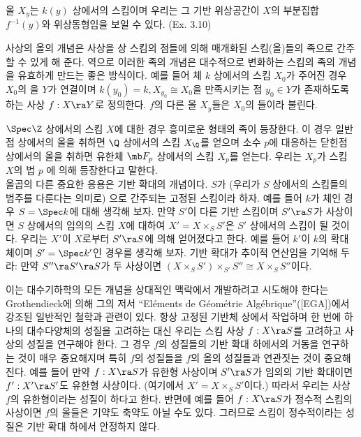 	올 $X_y$는 $k(y)$ 상에서의 스킴이며 우리는 그 기반 위상공간이 $X$의 부분집합 $f^{-1}(y)$와 위상동형임을 보일 수 있다. (Ex. 3.10)
	
	사상의 올의 개념은 사상을 상 스킴의 점들에 의해 매개화된 스킴(올)들의 족으로 간주할 수 있게 해 준다.
	역으로 이러한 족의 개념은 대수적으로 변화하는 스킴의 족의 개념을 유효하게 만드는 좋은 방식이다.
	예를 들어 체 $k$ 상에서의 스킴 $X_0$가 주어진 경우 $X_0$의 을
	$Y$가 연결이며 $k(y_0)=k,X_{y_0}\cong X_0$을 만족시키는 점 $y_0\in Y$가 존재하도록 하는 사상 $f:X\ra Y$로 정의한다.
	$f$의 다른 올 $X_y$들은 $X_0$의 들이라 불린다.
	
	$\Spec\Z$ 상에서의 스킴 $X$에 대한 경우 흥미로운 형태의 족이 등장한다.
	이 경우 일반점 상에서의 올을 취하면 $\Q$ 상에서의 스킴 $X_\Q$를 얻으며
	소수 $p$에 대응하는 닫힌점 상에서의 올을 취하면 유한체 $\mb F_p$ 상에서의 스킴 $X_p$를 얻는다.
	우리는 $X_p$가 스킴 $X$의 법 $p$ 에 의해 등장한다고 말한다.\\
	
	올곱의 다른 중요한 응용은 기반 확대의 개념이다. $S$가 (우리가 $S$ 상에서의 스킴들의 범주를 다룬다는 의미로)
	으로 간주되는 고정된 스킴이라 하자. 예를 들어 $k$가 체인 경우 $S=\Spec k$에 대해 생각해 보자.
	만약 $S'$이 다른 기반 스킴이며 $S'\ra S$가 사상이면
	$S$ 상에서의 임의의 스킴 $X$에 대하여 $X'=X\times_SS'$은 $S'$ 상에서의 스킴이 될 것이다.
	우리는 $X'$이 $X$로부터  $S'\ra S$에 의해 얻어졌다고 한다.
	예를 들어 $k'$이 $k$의 확대체이며 $S'=\Spec k'$인 경우를 생각해 보자.
	기반 확대가 추이적 연산임을 기억해 두라:
	만약 $S''\ra S'\ra S$가 두 사상이면 $(X\times_SS')\times_{S'}S''\cong X\times_SS''$이다.
	
	이는 대수기하학의 모든 개념을 상대적인 맥락에서 개발하려고 시도해야 한다는
	Grothendieck에 의해 그의 저서 ``El\'ements de G\'eom\'etrie Alg\'ebrique''([EGA])에서 강조된 일반적인 철학과 관련이 있다.
	항상 고정된 기반체 상에서 작업하며 한 번에 하나의 대수다양체의 성질을 고려하는 대신
	우리는 스킴 사상 $f:X\ra S$를 고려하고 사상의 성질을 연구해야 한다.
	그 경우 $f$의 성질들의 기반 확대 하에서의 거동을 연구하는 것이 매우 중요해지며
	특히 $f$의 성질들을 $f$의 올의 성질들과 연관짓는 것이 중요해진다.
	예를 들어 만약 $f:X\ra S$가 유한형 사상이며 $S'\ra S$가 임의의 기반 확대이면 $f':X'\ra S'$도 유한형 사상이다.
	(여기에서 $X'=X\times_SS'$이다.)
	따라서 우리는 사상 $f$의 유한형이라는 성질이 하다고 한다.
	반면에 예를 들어 $f:X\ra S$가 정수적 스킴의 사상이면 $f$의 올들은 기약도 축약도 아닐 수도 있다.
	그러므로 스킴이 정수적이라는 성질은 기반 확대 하에서 안정하지 않다.
	
